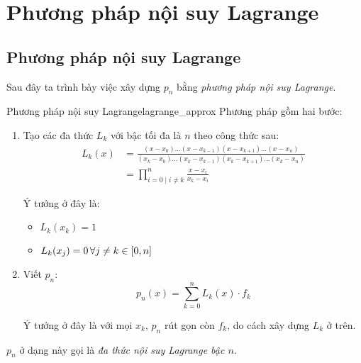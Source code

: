 \documentclass[../../Lectures]{subfiles}
\begin{document}

\section{Phương pháp nội suy Lagrange}

\subsection{Phương pháp nội suy Lagrange}

Sau đây ta trình bày việc xây dựng \(p_n\) bằng \emph{phương pháp nội suy
Lagrange}.

\begin{cmethod}{Phương pháp nội suy Lagrange}{lagrange_approx}
    Phương pháp gồm hai bước:
    \begin{enumerate}
        \item Tạo các đa thức \(L_k\) với bậc tối đa là \(n\) theo công thức sau:
            \begin{align*}
                L_k(x) &= \frac{(x - x_0) \ldots (x - x_{k - 1}) (x - x_{k + 1}) \ldots (x - x_n)}{(x_k - x_0) \ldots (x_k - x_{k - 1}) (x_k - x_{k + 1}) \ldots (x_k - x_n)} \\
                       &= \prod_{i = 0 \mid i \neq k}^{n} \frac{x - x_i}{x_k - x_i}
            \end{align*}

            Ý tưởng ở đây là:
            \begin{itemize}
                \item \(L_k(x_k) = 1\)
                \item \(L_k(x_j) = 0 \, \forall j \neq k \in \interval{0}{n} \)
            \end{itemize}

        \item Viết \(p_n\):
            \[p_n(x) = \sum_{k = 0}^{n} L_k(x) \cdot f_k\]

            Ý tưởng ở đây là với mọi \(x_k\), \(p_n\) rút gọn còn \(f_k\), do
            cách xây dựng \(L_k\) ở trên.
    \end{enumerate}
\end{cmethod}


\(p_n\) ở dạng này gọi là \emph{đa thức nội suy Lagrange bậc \(n\)}.
\end{document}
